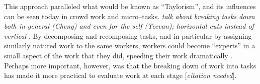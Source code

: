 \documentclass{sigchi}
\begin{document}
This approach paralleled what would be known as ``Taylorism'',
and its influences can be seen today in crowd work and micro--tasks.
\textit{talk about breaking tasks down both in general (Cheng) and even for the self (Teevan);
horizontal cuts instead of vertical}
\cite{cheng2015break,writingMicroTasks}.
By decomposing and recomposing tasks,
and in particular by assigning similarly natured work to the same workers,
workers could become ``experts'' in a small aspect of the work that they did,
speeding their work dramatically
\cite{delayAndOrderLasecki}.
Perhaps more important, however, was that
the breaking down of work into tasks has made it more practical to evaluate work at each stage
[\textit{citation needed}].






\end{document}
